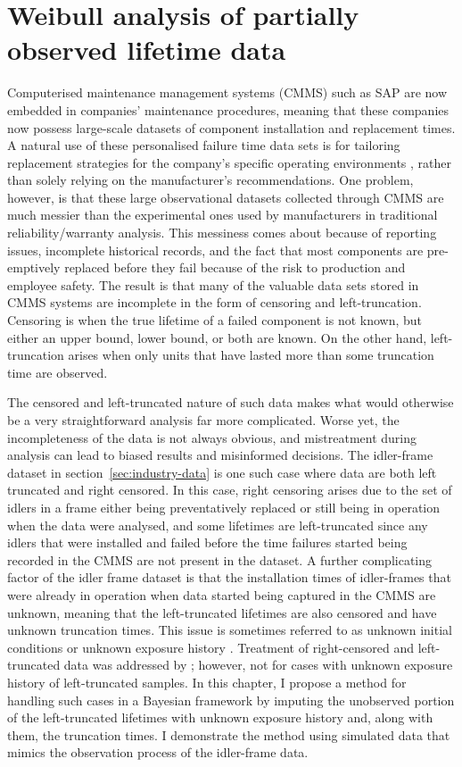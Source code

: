 \chapter{Weibull analysis of partially observed lifetime data} \label{chap:chapter2}

Computerised maintenance management systems (CMMS) such as SAP \citep{sap} are now embedded in companies' maintenance procedures, meaning that these companies now possess large-scale datasets of component installation and replacement times. A natural use of these personalised failure time data sets is for tailoring replacement strategies for the company's specific operating environments \citep[p. 13]{Meeker2022}, rather than solely relying on the manufacturer's recommendations. One problem, however, is that these large observational datasets collected through CMMS are much messier than the experimental ones used by manufacturers in traditional reliability/warranty analysis. This messiness comes about because of reporting issues, incomplete historical records, and the fact that most components are pre-emptively replaced before they fail because of the risk to production and employee safety. The result is that many of the valuable data sets stored in CMMS systems are incomplete in the form of censoring and left-truncation. Censoring is when the true lifetime of a failed component is not known, but either an upper bound, lower bound, or both are known. On the other hand, left-truncation arises when only units that have lasted more than some truncation time are observed.

The censored and left-truncated nature of such data makes what would otherwise be a very straightforward analysis far more complicated. Worse yet, the incompleteness of the data is not always obvious, and mistreatment during analysis can lead to biased results and misinformed decisions. The idler-frame dataset in section~\ref{sec:industry-data} is one such case where data are both left truncated and right censored. In this case, right censoring arises due to the set of idlers in a frame either being preventatively replaced or still being in operation when the data were analysed, and some lifetimes are left-truncated since any idlers that were installed and failed before the time failures started being recorded in the CMMS are not present in the dataset. A further complicating factor of the idler frame dataset is that the installation times of idler-frames that were already in operation when data started being captured in the CMMS are unknown, meaning that the left-truncated lifetimes are also censored and have unknown truncation times. This issue is sometimes referred to as unknown initial conditions or unknown exposure history \citep{guo1993}. Treatment of right-censored and left-truncated data was addressed by \citet{hong2009}; however, not for cases with unknown exposure history of left-truncated samples. In this chapter, I propose a method for handling such cases in a Bayesian framework by imputing the unobserved portion of the left-truncated lifetimes with unknown exposure history and, along with them, the truncation times. I demonstrate the method using simulated data that mimics the observation process of the idler-frame data.

